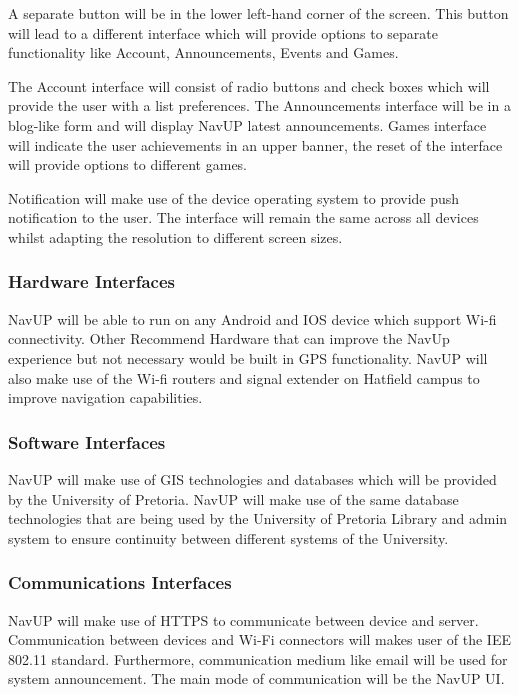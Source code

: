 \documentclass[12pt,a4paper]{article}
\begin{document}
A separate button will be in the lower left-hand corner of the screen. This button will lead to a different interface which will provide options to separate functionality like Account, Announcements, Events and Games.\newline

The Account interface will consist of radio buttons and check boxes which will provide the user with a list preferences. The Announcements interface will be in a blog-like form and will display NavUP latest announcements. Games interface will indicate the user achievements in an upper banner, the reset of the interface will provide options to different games.\newline

Notification will make use of the device operating system to provide push notification to the user. The interface will remain the same across all devices whilst adapting the resolution to different screen sizes.
		\subsubsection{Hardware Interfaces}
			NavUP will be able to run on any Android and IOS device which support Wi-fi connectivity. Other Recommend Hardware that can improve the NavUp experience but not necessary would be built in GPS functionality. NavUP will also make use of the Wi-fi routers and signal extender on Hatfield campus to improve navigation capabilities.
		\subsubsection{Software Interfaces}
			NavUP will make use of GIS technologies and databases which will be provided by the University of Pretoria. NavUP will make use of the same database technologies that are being used by the University of Pretoria Library and admin system to ensure continuity between different systems of the University.
		\subsubsection{Communications Interfaces}
			NavUP will make use of HTTPS to communicate between device and server. Communication between devices and Wi-Fi connectors will makes user of the IEE 802.11 standard.  Furthermore, communication medium like email will be used for system announcement. The main mode of communication will be the NavUP UI.
\end{document}
